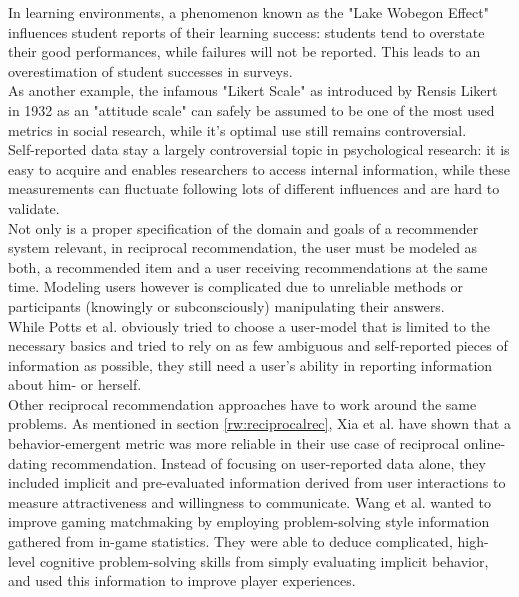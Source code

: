 \documentclass[conference]{IEEEtran}
\begin{document}
In learning environments, a phenomenon known as the "Lake Wobegon Effect" influences student reports of their learning success: students tend to overstate their good performances, while failures will not be reported. This leads to an overestimation of student successes in surveys. \cite{maxwell1994lake}\\
As another example, the infamous "Likert Scale" as introduced by Rensis Likert in 1932 as an "attitude scale" \cite{likert1932technique} can safely be assumed to be one of the most used metrics in social research, while it's optimal use still remains controversial. \cite{chang1994psychometric, lee2002cultural}\\
Self-reported data stay a largely controversial topic in psychological research: it is easy to acquire and enables researchers to access internal information, while these measurements can fluctuate following lots of different influences and are hard to validate. \cite{gonyea2005self, lee2002cultural, sorensen2008measuring}\\
Not only is a proper specification of the domain and goals of a recommender system relevant, in reciprocal recommendation, the user must be modeled as both, a recommended item and a user receiving recommendations at the same time. Modeling users however is complicated due to unreliable methods or participants (knowingly or subconsciously) manipulating their answers.\\
While Potts et al. obviously tried to choose a user-model that is limited to the necessary basics and tried to rely on as few ambiguous and self-reported pieces of information as possible, they still need a user's ability in reporting information about him- or herself.\\
Other reciprocal recommendation approaches have to work around the same problems. As mentioned in section \ref{rw:reciprocalrec}, Xia et al. have shown that a behavior-emergent metric was more reliable in their use case of reciprocal online-dating recommendation. \cite{xia2014characterization} Instead of focusing on user-reported data alone, they included implicit and pre-evaluated information derived from user interactions to measure attractiveness and willingness to communicate. \cite{xia2015reciprocal} Wang et al. wanted to improve gaming matchmaking by employing problem-solving style information gathered from in-game statistics. They were able to deduce complicated, high-level cognitive problem-solving skills from simply evaluating implicit behavior, and used this information to improve player experiences. \cite{wang2015thinking}\\
\end{document}
